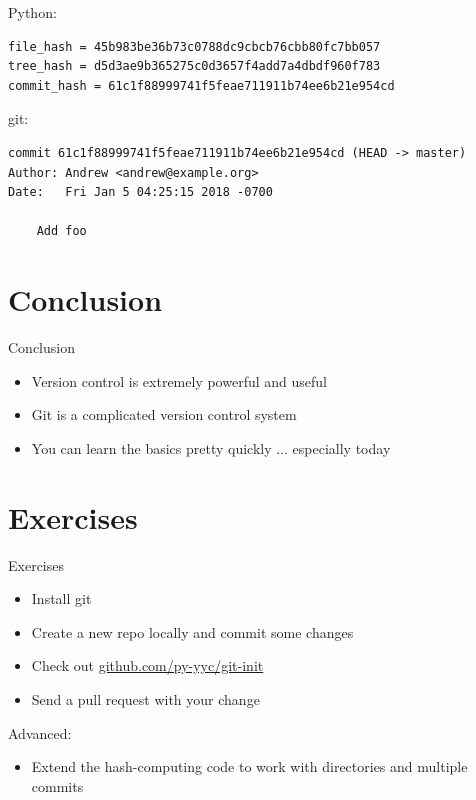 \documentclass[xcolor=svgnames,17pt]{beamer}
\newcommand*{\sizefont}[1]{%
    \ifcase#1\relax
    \or \tiny
    \or \scriptsize
    \or \footnotesize
    \or \small
    \or \normalsize
    \or \large
    \or \Large
    \or \LARGE
    \or \huge
    \or \Huge
    \fi}
\begin{document}
\begin{frame}[fragile]
\sizefont{2}
Python:
\begin{verbatim}
file_hash = 45b983be36b73c0788dc9cbcb76cbb80fc7bb057
tree_hash = d5d3ae9b365275c0d3657f4add7a4dbdf960f783
commit_hash = 61c1f88999741f5feae711911b74ee6b21e954cd
\end{verbatim}

git:
\begin{verbatim}
commit 61c1f88999741f5feae711911b74ee6b21e954cd (HEAD -> master)
Author: Andrew <andrew@example.org>
Date:   Fri Jan 5 04:25:15 2018 -0700

    Add foo
\end{verbatim}
\end{frame}

\section{Conclusion}

\begin{frame}{Conclusion}
\begin{itemize}
\item Version control is extremely powerful and useful
\pause
\item Git is a complicated version control system
\pause
\item You can learn the basics pretty quickly ... especially today
\end{itemize}
\end{frame}

\section{Exercises}

\begin{frame}{Exercises}
\begin{itemize}
\item Install git
\item Create a new repo locally and commit some changes
\item Check out \href{https://github.com/py-yyc/git-init}{github.com/py-yyc/git-init}
\item Send a pull request with your change
\end{itemize}
Advanced:
\begin{itemize}
\item Extend the hash-computing code to work with directories and multiple
commits
\end{itemize}
\end{frame}
\end{document}
